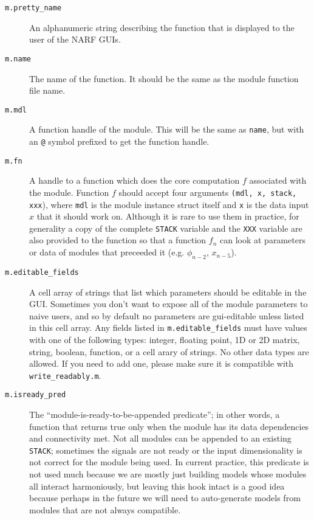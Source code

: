 \documentclass[letterpaper]{report}
\newcommand{\matlab}[1]{\texttt{#1}}
\begin{document}
\begin{description}
\item [\matlab{m.pretty\_name}] An alphanumeric string describing the function that is displayed to the user of the NARF GUIs. 

\item [\matlab{m.name}] The name of the function. It should be the same as the module function file name. 

\item [\matlab{m.mdl}] A function handle of the module. This will be the same as \matlab{name}, but with an \matlab{@} symbol prefixed to get the function handle. 

\item [\matlab{m.fn}] A handle to a function which does the core computation $f$ associated with the module. Function $f$ should accept four arguments \matlab{(mdl, x, stack, xxx}), where \matlab{mdl} is the module instance struct itself and \matlab{x} is the data input $x$ that it should work on. Although it is rare to use them in practice, for generality a copy of the complete \matlab{STACK} variable and the \matlab{XXX} variable are also provided to the function so that a function $f_n$ can look at parameters or data of modules that preceeded it (e.g. $\phi_{n-2}$, $x_{n-5}$).

\item [\matlab{m.editable\_fields}] A cell array of strings that list which parameters should be editable in the GUI. Sometimes you don't want to expose all of the module parameters to naive users, and so by default no parameters are gui-editable unless listed in this cell array. Any fields listed in \matlab{m.editable\_fields} must have values with one of the following types: integer, floating point, 1D or 2D matrix, string, boolean, function, or a cell arary of strings. No other data types are allowed. If you need to add one, please make sure it is compatible with \matlab{write\_readably.m}.

\item [\matlab{m.isready\_pred}] The ``module-is-ready-to-be-appended predicate''; in other words, a function that returns true only when the module has its data dependencies and connectivity met. Not all modules can be appended to an existing \matlab{STACK}; sometimes the signals are not ready or the input dimensionality is not correct for the module being used. In current practice, this predicate is not used much because we are mostly just building models whose modules all interact harmoniously, but leaving this hook intact is a good idea because perhaps in the future we will need to auto-generate models from modules that are not always compatible. 

\end{description}
\end{document}
